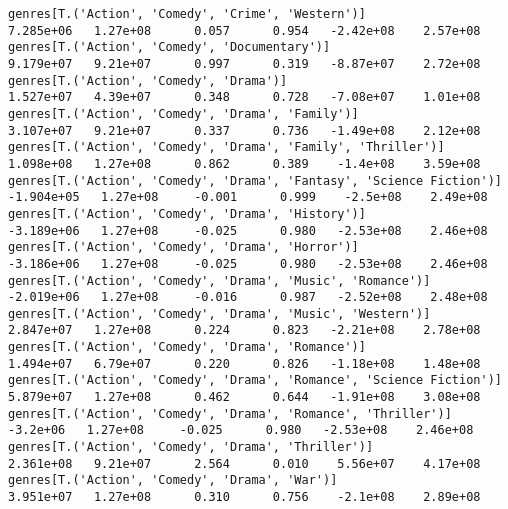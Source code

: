 \documentclass[11pt]{article}
\begin{document}
\begin{Verbatim}[commandchars=\\\{\}]
genres[T.('Action', 'Comedy', 'Crime', 'Western')]                                                            7.285e+06   1.27e+08      0.057      0.954   -2.42e+08    2.57e+08
genres[T.('Action', 'Comedy', 'Documentary')]                                                                 9.179e+07   9.21e+07      0.997      0.319   -8.87e+07    2.72e+08
genres[T.('Action', 'Comedy', 'Drama')]                                                                       1.527e+07   4.39e+07      0.348      0.728   -7.08e+07    1.01e+08
genres[T.('Action', 'Comedy', 'Drama', 'Family')]                                                             3.107e+07   9.21e+07      0.337      0.736   -1.49e+08    2.12e+08
genres[T.('Action', 'Comedy', 'Drama', 'Family', 'Thriller')]                                                 1.098e+08   1.27e+08      0.862      0.389    -1.4e+08    3.59e+08
genres[T.('Action', 'Comedy', 'Drama', 'Fantasy', 'Science Fiction')]                                        -1.904e+05   1.27e+08     -0.001      0.999    -2.5e+08    2.49e+08
genres[T.('Action', 'Comedy', 'Drama', 'History')]                                                           -3.189e+06   1.27e+08     -0.025      0.980   -2.53e+08    2.46e+08
genres[T.('Action', 'Comedy', 'Drama', 'Horror')]                                                            -3.186e+06   1.27e+08     -0.025      0.980   -2.53e+08    2.46e+08
genres[T.('Action', 'Comedy', 'Drama', 'Music', 'Romance')]                                                  -2.019e+06   1.27e+08     -0.016      0.987   -2.52e+08    2.48e+08
genres[T.('Action', 'Comedy', 'Drama', 'Music', 'Western')]                                                   2.847e+07   1.27e+08      0.224      0.823   -2.21e+08    2.78e+08
genres[T.('Action', 'Comedy', 'Drama', 'Romance')]                                                            1.494e+07   6.79e+07      0.220      0.826   -1.18e+08    1.48e+08
genres[T.('Action', 'Comedy', 'Drama', 'Romance', 'Science Fiction')]                                         5.879e+07   1.27e+08      0.462      0.644   -1.91e+08    3.08e+08
genres[T.('Action', 'Comedy', 'Drama', 'Romance', 'Thriller')]                                                 -3.2e+06   1.27e+08     -0.025      0.980   -2.53e+08    2.46e+08
genres[T.('Action', 'Comedy', 'Drama', 'Thriller')]                                                           2.361e+08   9.21e+07      2.564      0.010    5.56e+07    4.17e+08
genres[T.('Action', 'Comedy', 'Drama', 'War')]                                                                3.951e+07   1.27e+08      0.310      0.756    -2.1e+08    2.89e+08

\end{Verbatim}
\end{document}
